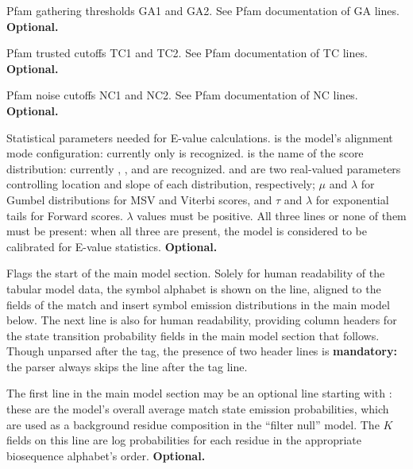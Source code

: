 \begin{sreitems}{}
\item [\emprog{GA    <f> <f>}] Pfam gathering thresholds GA1 and GA2.
See Pfam documentation of GA lines. \textbf{Optional.}

\item [\emprog{TC <f> <f>}] Pfam trusted cutoffs TC1 and TC2.  See
Pfam documentation of TC lines. \textbf{Optional.}

\item [\emprog{NC <f> <f>}] Pfam noise cutoffs NC1 and NC2.  See Pfam
documentation of NC lines. \textbf{Optional.}

\item [\emprog{STATS <s1> <s2> <f1> <f2>}] Statistical parameters
  needed for E-value calculations.  is the model's
  alignment mode configuration: currently only  is
  recognized.  is the name of the score distribution:
  currently , , and  are
  recognized.   and  are two real-valued
  parameters controlling location and slope of each distribution,
  respectively; $\mu$ and $\lambda$ for Gumbel distributions for MSV
  and Viterbi scores, and $\tau$ and $\lambda$ for exponential tails
  for Forward scores.  $\lambda$ values must be positive.  All three
  lines or none of them must be present: when all three are present,
  the model is considered to be calibrated for E-value
  statistics. \textbf{Optional.}

\item [\emprog{HMM }] Flags the start of the main model
section. Solely for human readability of the tabular model data, the
symbol alphabet is shown on the  line, aligned to the fields
of the match and insert symbol emission distributions in the main
model below. The next line is also for human readability, providing
column headers for the state transition probability fields in the main
model section that follows. Though unparsed after the  tag,
the presence of two header lines is \textbf{mandatory:} the parser
always skips the line after the  tag line.

\item [\emprog{COMPO <f>*K}] The first line in the main model section
may be an optional line starting with : these are the
model's overall average match state emission probabilities, which are
used as a background residue composition in the ``filter null''
model. The $K$ fields on this line are log probabilities for each
residue in the appropriate biosequence alphabet's
order. \textbf{Optional.}

\end{sreitems}

